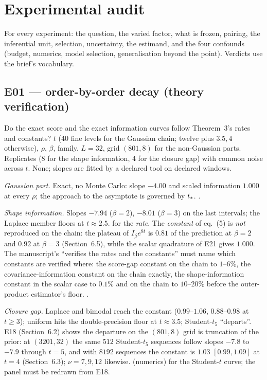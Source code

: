 \section{Experimental audit}
\label{sec:exp}

For every experiment: the question, the varied factor, what is frozen, pairing, the inferential unit, selection, uncertainty, the estimand, and the four confounds (budget, numerics, model selection, generalisation beyond the point). Verdicts use the brief's vocabulary.

\subsection{E01 --- order-by-order decay (theory verification)}
 Do the exact score and the exact information curves follow Theorem~3's rates and constants?  $t$ (40 fine levels for the Gaussian chain; twelve plus $3.5, 4$ otherwise), $\rho$, $\beta$, family.  $L=32$, grid $(801,8)$ for the non-Gaussian parts.  Replicates (8 for the shape information, 4 for the closure gap) with common noise across $t$.  None; slopes are fitted by a declared tool on declared windows.

\emph{Gaussian part.} Exact, no Monte Carlo: slope $-4.00$ and scaled information $1.000$ at every $\rho$; the approach to the asymptote is governed by $t_\ast$. .

\emph{Shape information.} Slopes $-7.94$ ($\beta=2$), $-8.01$ ($\beta=3$) on the last intervals; the Laplace member floors at $t\approx2.5$.  for the \emph{rate}. The \emph{constant} of eq.~(5) is \emph{not} reproduced on the chain: the plateau of $I_\beta e^{8t}$ is $0.81$ of the prediction at $\beta=2$ and $0.92$ at $\beta=3$ (Section~6.5), while the scalar quadrature of E21 gives $1.000$. The manuscript's ``verifies the rates and the constants'' must name which constants are verified where: the score-gap constant on the chain to $1$--$6\%$, the covariance-information constant on the chain exactly, the shape-information constant in the scalar case to $0.1\%$ and on the chain to $10$--$20\%$ before the outer-product estimator's floor. .

\emph{Closure gap.} Laplace and bimodal reach the constant ($0.99$--$1.06$, $0.88$--$0.98$ at $t\ge3$); uniform hits the double-precision floor at $t\approx3.5$; Student-$t_5$ ``departs''. E18 (Section~6.2) shows the departure on the $(801,8)$ grid is truncation of the prior: at $(3201,32)$ the same $512$ Student-$t_5$ sequences follow slopes $-7.8$ to $-7.9$ through $t=5$, and with $8192$ sequences the constant is $1.03$ $[0.99,1.09]$ at $t=4$ (Section~6.3); $\nu=7, 9, 12$ likewise.  (numerics) for the Student-$t$ curve; the panel must be redrawn from E18.

